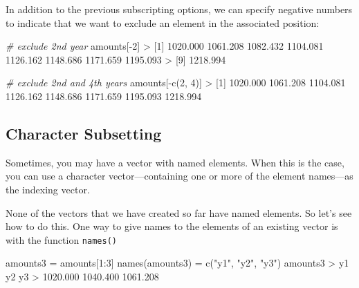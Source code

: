 \documentclass[
]{book}
\newenvironment{Shaded}{\begin{snugshade}}{\end{snugshade}}
\newcommand{\CommentTok}[1]{\textcolor[rgb]{0.56,0.35,0.01}{\textit{#1}}}
\newcommand{\DecValTok}[1]{\textcolor[rgb]{0.00,0.00,0.81}{#1}}
\newcommand{\FloatTok}[1]{\textcolor[rgb]{0.00,0.00,0.81}{#1}}
\newcommand{\FunctionTok}[1]{\textcolor[rgb]{0.00,0.00,0.00}{#1}}
\newcommand{\NormalTok}[1]{#1}
\newcommand{\OtherTok}[1]{\textcolor[rgb]{0.56,0.35,0.01}{#1}}
\newcommand{\SpecialCharTok}[1]{\textcolor[rgb]{0.00,0.00,0.00}{#1}}
\newcommand{\StringTok}[1]{\textcolor[rgb]{0.31,0.60,0.02}{#1}}
\begin{document}
In addition to the previous subscripting options, we can specify negative
numbers to indicate that we want to exclude an element in the associated
position:

\begin{Shaded}
\begin{Highlighting}[]
\CommentTok{\# exclude 2nd year}
\NormalTok{amounts[}\SpecialCharTok{{-}}\DecValTok{2}\NormalTok{]}
\SpecialCharTok{\textgreater{}}\NormalTok{ [}\DecValTok{1}\NormalTok{] }\FloatTok{1020.000} \FloatTok{1061.208} \FloatTok{1082.432} \FloatTok{1104.081} \FloatTok{1126.162} \FloatTok{1148.686} \FloatTok{1171.659} \FloatTok{1195.093}
\SpecialCharTok{\textgreater{}}\NormalTok{ [}\DecValTok{9}\NormalTok{] }\FloatTok{1218.994}

\CommentTok{\# exclude 2nd and 4th years}
\NormalTok{amounts[}\SpecialCharTok{{-}}\FunctionTok{c}\NormalTok{(}\DecValTok{2}\NormalTok{, }\DecValTok{4}\NormalTok{)]}
\SpecialCharTok{\textgreater{}}\NormalTok{ [}\DecValTok{1}\NormalTok{] }\FloatTok{1020.000} \FloatTok{1061.208} \FloatTok{1104.081} \FloatTok{1126.162} \FloatTok{1148.686} \FloatTok{1171.659} \FloatTok{1195.093} \FloatTok{1218.994}
\end{Highlighting}
\end{Shaded}

\hypertarget{character-subsetting}{%
\subsection{Character Subsetting}\label{character-subsetting}}

Sometimes, you may have a vector with named elements. When this is the case,
you can use a character vector---containing one or more of the element names---as
the indexing vector.

None of the vectors that we have created so far have named elements. So let's
see how to do this. One way to give names to the elements of an existing vector
is with the function \texttt{names()}

\begin{Shaded}
\begin{Highlighting}[]
\NormalTok{amounts3 }\OtherTok{=}\NormalTok{ amounts[}\DecValTok{1}\SpecialCharTok{:}\DecValTok{3}\NormalTok{]}
\FunctionTok{names}\NormalTok{(amounts3) }\OtherTok{=} \FunctionTok{c}\NormalTok{(}\StringTok{"y1"}\NormalTok{, }\StringTok{"y2"}\NormalTok{, }\StringTok{"y3"}\NormalTok{)}
\NormalTok{amounts3}
\SpecialCharTok{\textgreater{}}\NormalTok{       y1       y2       y3 }
\SpecialCharTok{\textgreater{}} \FloatTok{1020.000} \FloatTok{1040.400} \FloatTok{1061.208}
\end{Highlighting}
\end{Shaded}
\end{document}
